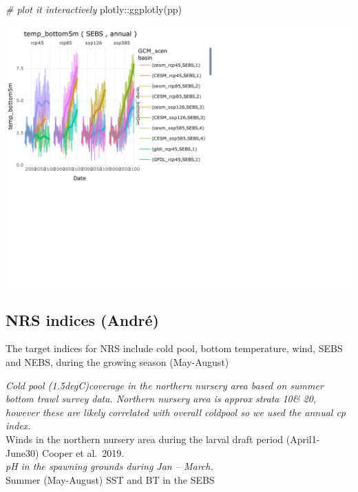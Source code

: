 \documentclass[
]{article}
\newenvironment{Shaded}{\begin{snugshade}}{\end{snugshade}}
\newcommand{\CommentTok}[1]{\textcolor[rgb]{0.56,0.35,0.01}{\textit{#1}}}
\newcommand{\FunctionTok}[1]{\textcolor[rgb]{0.00,0.00,0.00}{#1}}
\newcommand{\NormalTok}[1]{#1}
\newcommand{\SpecialCharTok}[1]{\textcolor[rgb]{0.00,0.00,0.00}{#1}}
\begin{document}
\begin{Shaded}
\begin{Highlighting}[]
  \CommentTok{\# plot it interactively}
\NormalTok{  plotly}\SpecialCharTok{::}\FunctionTok{ggplotly}\NormalTok{(pp)}
\end{Highlighting}
\end{Shaded}

\begin{center}\includegraphics{ACLIM2_quickStart_files/figure-latex/unnamed-chunk-5-1} \end{center}

\hypertarget{nrs-indices-andruxe9}{%
\subsection{NRS indices (André)}\label{nrs-indices-andruxe9}}

The target indices for NRS include cold pool, bottom temperature, wind,
SEBS and NEBS, during the growing season (May-August)

\emph{Cold pool (1.5degC)coverage in the northern nursery area based on
summer bottom trawl survey data. Northern nursery area is approx strata
10\& 20, however these are likely correlated with overall coldpool so we
used the annual cp index.\\
}Winds in the northern nursery area during the larval draft period
(April1-June30) Cooper et al.~2019.\\
\emph{pH in the spawning grounds during Jan -- March.\\
}Summer (May-August) SST and BT in the SEBS
\end{document}
